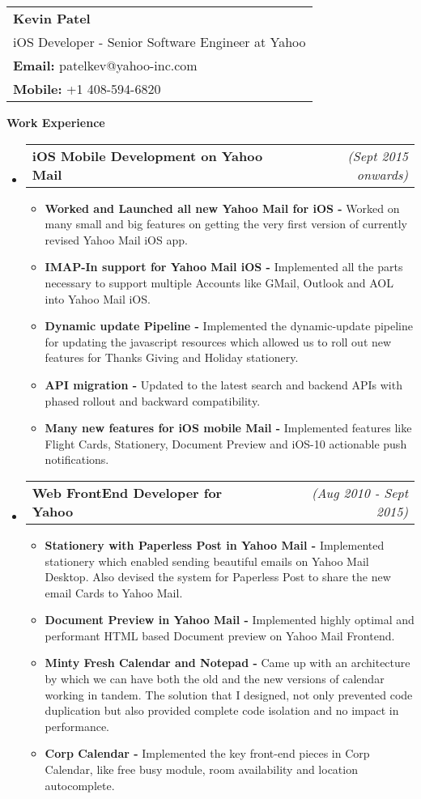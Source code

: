 \documentclass[a4paper,11pt,times]{res}
\makeatletter
\newcommand{\smalitem}[1]{\item #1 \vspace{-4pt}}
\newcommand{\resheading}[1]{{\large \colorbox{mygrey}{\begin{minipage}{\textwidth}{\textbf{#1 \vphantom{p\^{E}}}}\end{minipage}}\vspace{4pt}}}
\newcommand{\mysubheading}[2]{
\begin{tabular*}{172mm}{l@{\extracolsep{\fill}}r}
		\textbf{#1} & \textit{#2} \\
\end{tabular*}\vspace{-1pt}}
\makeatother
\begin{document}
\vspace{-2pt}
\begin{tabular*}{160mm}{l}
\textbf{Kevin Patel} \\
iOS Developer -  Senior Software Engineer at Yahoo \\
\textbf{Email:} patelkev@yahoo-inc.com \\
\textbf{Mobile:} +1 408-594-6820 \\
\end{tabular*}

\resheading{Work Experience}
\begin{itemize}

\item
\mysubheading{iOS Mobile Development on Yahoo Mail }{(Sept 2015 onwards)}
\begin{itemize}
\vspace{-2pt}
\smalitem{\textbf{Worked and Launched all new Yahoo Mail for iOS -} Worked on many small and big features on getting the very first version of currently revised Yahoo Mail iOS app.}
\smalitem{\textbf{IMAP-In support for Yahoo Mail iOS -} Implemented all the parts necessary to support multiple Accounts like GMail, Outlook and AOL into Yahoo Mail iOS.}
\smalitem{\textbf{Dynamic update Pipeline -} Implemented the dynamic-update pipeline for updating the javascript resources which allowed us to roll out new features for Thanks Giving and Holiday stationery.}
\smalitem{\textbf{API migration -} Updated to the latest search and backend APIs with phased rollout and backward compatibility.}
\smalitem{\textbf{Many new features for iOS mobile Mail -} Implemented features like Flight Cards, Stationery, Document Preview and iOS-10 actionable push notifications.}

\end{itemize}

\vspace{2pt}

\item
\mysubheading{Web FrontEnd Developer for Yahoo }{(Aug 2010 - Sept 2015)}
\begin{itemize}
\vspace{-2pt}
\smalitem{\textbf{Stationery with Paperless Post in Yahoo Mail -} Implemented stationery which enabled sending beautiful emails on Yahoo Mail Desktop. Also devised the system for Paperless Post to share the new email Cards to Yahoo Mail.}
\smalitem{\textbf{Document Preview in Yahoo Mail -} Implemented highly optimal and performant HTML based Document preview on Yahoo Mail Frontend.}
\smalitem{\textbf{Minty Fresh Calendar and Notepad -} Came up with an architecture by which we can have both the old and the new versions of calendar working in tandem. The solution that I designed, not only prevented code duplication but also provided complete code isolation and no impact in performance.}
\smalitem{\textbf{Corp Calendar -} Implemented the key front-end pieces in Corp Calendar, like free busy module, room availability and location autocomplete.}
\end{itemize}

\end{itemize}
\end{document}
